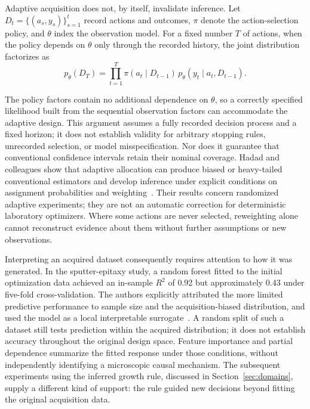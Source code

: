\begin{samepage}
Adaptive acquisition does not, by itself, invalidate inference. Let $D_t=\{(a_s,y_s)\}_{s=1}^{t}$ record actions and outcomes, $\pi$ denote the action-selection policy, and $\theta$ index the observation model. For a fixed number $T$ of actions, when the policy depends on $\theta$ only through the recorded history, the joint distribution factorizes as
\begin{equation}
p_\theta(D_T)=\prod_{t=1}^{T}\pi(a_t\mid D_{t-1})\,p_\theta(y_t\mid a_t,D_{t-1}).
\label{eq:adaptive-evidence}
\end{equation}
\end{samepage}
The policy factors contain no additional dependence on $\theta$, so a correctly specified likelihood built from the sequential observation factors can accommodate the adaptive design. This argument assumes a fully recorded decision process and a fixed horizon; it does not establish validity for arbitrary stopping rules, unrecorded selection, or model misspecification. Nor does it guarantee that conventional confidence intervals retain their nominal coverage. Hadad and colleagues show that adaptive allocation can produce biased or heavy-tailed conventional estimators and develop inference under explicit conditions on assignment probabilities and weighting~\cite{hadad2021}. Their results concern randomized adaptive experiments; they are not an automatic correction for deterministic laboratory optimizers. Where some actions are never selected, reweighting alone cannot reconstruct evidence about them without further assumptions or new observations.

Interpreting an acquired dataset consequently requires attention to how it was generated. In the sputter-epitaxy study, a random forest fitted to the initial optimization data achieved an in-sample $R^2$ of 0.92 but approximately 0.43 under five-fold cross-validation. The authors explicitly attributed the more limited predictive performance to sample size and the acquisition-biased distribution, and used the model as a local interpretable surrogate~\cite{asd0999}. A random split of such a dataset still tests prediction within the acquired distribution; it does not establish accuracy throughout the original design space. Feature importance and partial dependence summarize the fitted response under those conditions, without independently identifying a microscopic causal mechanism. The subsequent experiments using the inferred growth rule, discussed in Section~\ref{sec:domains}, supply a different kind of support: the rule guided new decisions beyond fitting the original acquisition data.

